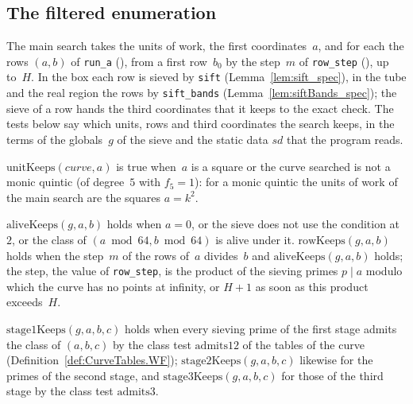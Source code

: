 \subsection{The filtered enumeration}\label{sec:theoremsFilters}

The main search takes the units of work, the first coordinates~$a$, and for each the rows $(a, b)$
of \texttt{run\_a} (), from a first row~$b_0$ by the step~$m$ of
\texttt{row\_step} (), up to~$H$. In the box each row is sieved by
\texttt{sift} (Lemma~\ref{lem:sift_spec}), in the tube and the real region the rows by
\texttt{sift\_bands} (Lemma~\ref{lem:siftBands_spec}); the sieve of a row hands the third
coordinates that it keeps to the exact check. The tests below say which units, rows and third
coordinates the search keeps, in the terms of the globals~$g$ of the sieve and the static data
$\mathit{sd}$ that the program reads.

\begin{definition}\label{def:unitKeeps}
  \leanok
  $\mathrm{unitKeeps}(\mathit{curve}, a)$ is true when~$a$ is a square or the curve searched is not
  a monic quintic (of degree~$5$ with $f_5 = 1$): for a monic quintic the units of work of the main
  search are the squares $a = k^2$.
\end{definition}

\begin{definition}\label{def:rowKeeps}
  \leanok
  $\mathrm{aliveKeeps}(g, a, b)$ holds when $a = 0$, or the sieve does not use the condition at~$2$,
  or the class of $(a \bmod 64, b \bmod 64)$ is alive under it. $\mathrm{rowKeeps}(g, a, b)$ holds
  when the step~$m$ of the rows of~$a$ divides~$b$ and $\mathrm{aliveKeeps}(g, a, b)$ holds; the
  step, the value of \texttt{row\_step}, is the product of the sieving primes $p \mid a$ modulo
  which the curve has no points at infinity, or $H + 1$ as soon as this product exceeds~$H$.
\end{definition}

\begin{definition}\label{def:stage1Keeps}
  \leanok
  $\mathrm{stage1Keeps}(g, a, b, c)$ holds when every sieving prime of the first stage admits the
  class of $(a, b, c)$ by the class test $\mathrm{admits12}$ of the tables of the curve
  (Definition~\ref{def:CurveTables.WF}); $\mathrm{stage2Keeps}(g, a, b, c)$ likewise for the primes
  of the second stage, and $\mathrm{stage3Keeps}(g, a, b, c)$ for those of the third stage by the
  class test $\mathrm{admits3}$.
\end{definition}

